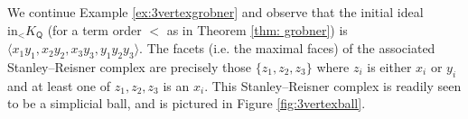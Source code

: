 \documentclass[ALCO,published]{cedram}
\numberwithin{equation}{section}
\newcommand{\1}{^{-1}}
\def\Q{\mathsf{Q}}
\begin{document}
\begin{ex}
We continue Example \ref{ex:3vertexgrobner} and observe that the initial ideal $\textrm{in}_< K_\Q$ (for a term order $<$ as in Theorem \ref{thm: grobner}) is $\langle x_1y_1, x_2y_2, x_3y_3, y_1y_2y_3\rangle$. The facets (i.e. the maximal faces) of the associated Stanley--Reisner complex are precisely those $\{z_1,z_2,z_3\}$ where $z_i$ is either $x_i$ or $y_i$ and at least one of $z_1, z_2, z_3$ is an $x_i$. This Stanley--Reisner complex is readily seen to be a simplicial ball, and is pictured in Figure \ref{fig:3vertexball}.

\begin{figure}


\end{figure}
\end{ex}
\end{document}
